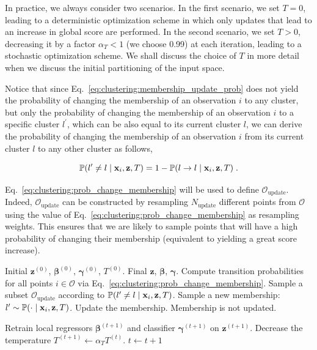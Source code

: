 \smallskip
In practice, we always consider two scenarios. In the first scenario, we set $T=0$, leading to a deterministic optimization scheme in which only updates that lead to an increase in global score are performed. In the second scenario, we set $T>0$, decreasing it by a factor $\alpha_T < 1$ (we choose 0.99) at each iteration, leading to a stochastic optimization scheme. We shall discuss the choice of $T$ in more detail when we discuss the initial partitioning of the input space.

\smallskip
Notice that since Eq.~\eqref{eq:clustering:membership_update_prob} does not yield the probability of changing the membership of an observation $i$ to any cluster, but only the probability of changing the membership of an observation $i$ to a specific cluster $l^\prime$, which can be also equal to its current cluster $l$, we can derive the probability of changing the membership of an observation $i$ from its current cluster $l$ to any other cluster as follows,

\begin{equation}
  \mathbb{P}(l^\prime \neq l \mid \mathbf{x}_i, \mathbf{z}, T) = 1 - \mathbb{P}(l \rightarrow l \mid \mathbf{x}_i, \mathbf{z}, T) \;.
  \label{eq:clustering:prob_change_membership}
\end{equation}

Eq.~\eqref{eq:clustering:prob_change_membership} will be used to define $\mathcal{O}_{\mathrm{update}}$. Indeed, $\mathcal{O}_{\mathrm{update}}$ can be constructed by resampling $N_{\mathrm{update}}$ different points from $\mathcal{O}$ using the value of Eq.~\eqref{eq:clustering:prob_change_membership} as resampling weights. This ensures that we are likely to sample points that will have a high probability of changing their membership (equivalent to yielding a great score increase).


\begin{algorithm}[htbp]
  \caption{Model-Based Clustering}
  \label{alg:clustering:model_clustering}
  \begin{algorithmic}[1]
    \Require Initial $\mathbf{z}^{(0)}$, $\boldsymbol{\beta}^{(0)}$, $\boldsymbol{\gamma}^{(0)}$, $T^{(0)}$.
    \Ensure Final $\mathbf{z}$, $\boldsymbol{\beta}$, $\boldsymbol{\gamma}$.
      \State Compute transition probabilities for all points $i \in \mathcal{O}$ via Eq.~\eqref{eq:clustering:prob_change_membership}.
      \State Sample a subset $\mathcal{O}_{\mathrm{update}}$ according to $\mathbb{P}(l^\prime \neq l \mid \mathbf{x}_i, \mathbf{z}, T)$.
        \State Sample a new membership: $l^\prime \sim \mathbb{P}( \cdot \mid \mathbf{x}_i, \mathbf{z}, T)$.
        \State Update the membership.
    \Else
        \State Membership is not updated.
    \EndIf

      \EndFor
      \State Retrain local regressors $\boldsymbol{\beta}^{(t+1)}$ and classifier $\boldsymbol{\gamma}^{(t+1)}$ on $\mathbf{z}^{(t+1)}$.
      \State Decrease the temperature $T^{(t+1)} \gets \alpha_T T^{(t)}$.
      \State $t \gets t + 1$
    \EndWhile
  \end{algorithmic}
\end{algorithm}


